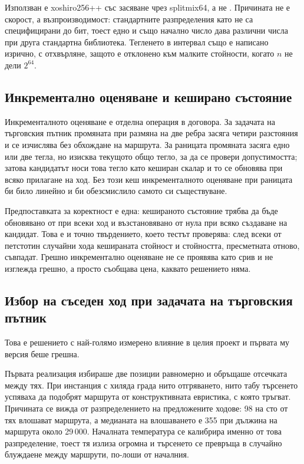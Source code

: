 Използван е xoshiro256++ със засяване чрез splitmix64, а не .
Причината не е скорост, а възпроизводимост: стандартните разпределения като
 не са специфицирани до бит, тоест едно и също
начално число дава различни числа при друга стандартна библиотека. Тегленето в
интервал също е написано изрично, с отхвърляне, защото  е отклонено
към малките стойности, когато $n$ не дели $2^{64}$.

\subsection{Инкрементално оценяване и кеширано състояние}
\label{subsec:impl-delta}

Инкременталното оценяване е отделна операция в договора. За задачата на търговския
пътник промяната при размяна на две ребра засяга четири разстояния и се изчислява без
обхождане на маршрута. За раницата промяната засяга едно или две тегла, но изисква
текущото общо тегло, за да се провери допустимостта; затова кандидатът носи това тегло
като кеширан скалар и то се обновява при всяко прилагане на ход. Без този кеш
инкременталното оценяване при раницата би било линейно и би обезсмислило самото си
съществуване.

Предпоставката за коректност е една: кешираното състояние трябва да бъде обновявано
от  при всеки ход и възстановявано от нула при всяко създаване на
кандидат. Това е и точно твърдението, което тестът
 проверява: след всеки от петстотин
случайни хода кешираната стойност и стойността, пресметната отново, съвпадат. Грешно
инкрементално оценяване не се проявява като срив и не изглежда грешно, а просто
съобщава цена, каквато решението няма.

\subsection{Избор на съседен ход при задачата на търговския пътник}
\label{subsec:impl-move}

Това е решението с най-голямо измерено влияние в целия проект и първата му версия
беше грешна.

Първата реализация избираше две позиции равномерно и обръщаше отсечката между тях.
При инстанция с хиляда града нито отгряването, нито табу търсенето успяваха да
подобрят маршрута от конструктивната евристика, с която тръгват. Причината се вижда
от разпределението на предложените ходове: 98 на сто от тях влошават маршрута, а
медианата на влошаването е 355 при дължина на маршрута около 29\,000. Началната
температура се калибрира именно от това разпределение, тоест тя излиза огромна и
търсенето се превръща в случайно блуждаене между маршрути, по-лоши от началния.

